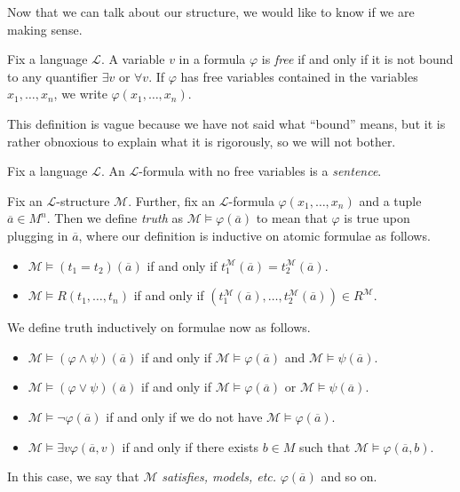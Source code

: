 \documentclass[../notes.tex]{subfiles}
\begin{document}
Now that we can talk about our structure, we would like to know if we are making sense.
\begin{definition}
	Fix a language $\mathcal L$. A variable $v$ in a formula $\varphi$ is \textit{free} if and only if it is not bound to any quantifier $\exists v$ or $\forall v$. If $\varphi$ has free variables contained in the variables $x_1,\ldots,x_n$, we write $\varphi(x_1,\ldots,x_n)$.
\end{definition}
This definition is vague because we have not said what ``bound'' means, but it is rather obnoxious to explain what it is rigorously, so we will not bother.
\begin{definition}[sentence]
	Fix a language $\mathcal L$. An $\mathcal L$-formula with no free variables is a \textit{sentence}.
\end{definition}
\begin{definition}[truth]
	Fix an $\mathcal L$-structure $\mathcal M$. Further, fix an $\mathcal L$-formula $\varphi(x_1,\ldots,x_n)$ and a tuple $\overline a\in M^n$. Then we define \textit{truth} as $\mathcal M\models\varphi(\overline a)$ to mean that $\varphi$ is true upon plugging in $\overline a$, where our definition is inductive on atomic formulae as follows.
	\begin{itemize}
		\item $\mathcal M\models(t_1=t_2)(\overline a)$ if and only if $t_1^\mathcal M(\overline a)=t_2^\mathcal M(\overline a)$.
		\item $\mathcal M\models R(t_1,\ldots,t_n)$ if and only if $\left(t_1^\mathcal M(\overline a),\ldots,t_2^\mathcal M(\overline a)\right)\in R^\mathcal M$.
	\end{itemize}
	We define truth inductively on formulae now as follows.
	\begin{itemize}
		\item $\mathcal M\models(\varphi\land\psi)(\overline a)$ if and only if $\mathcal M\models\varphi(\overline a)$ and $\mathcal M\models\psi(\overline a)$.
		\item $\mathcal M\models(\varphi\lor\psi)(\overline a)$ if and only if $\mathcal M\models\varphi(\overline a)$ or $\mathcal M\models\psi(\overline a)$.
		\item $\mathcal M\models\lnot\varphi(\overline a)$ if and only if we do not have $\mathcal M\models\varphi(\overline a)$.
		\item $\mathcal M\models\exists v\varphi(\overline a,v)$ if and only if there exists $b\in M$ such that $\mathcal M\models\varphi(\overline a,b)$.
	\end{itemize}
	In this case, we say that $\mathcal M$ \textit{satisfies, models, etc.} $\varphi(\overline a)$ and so on.
\end{definition}
\end{document}
